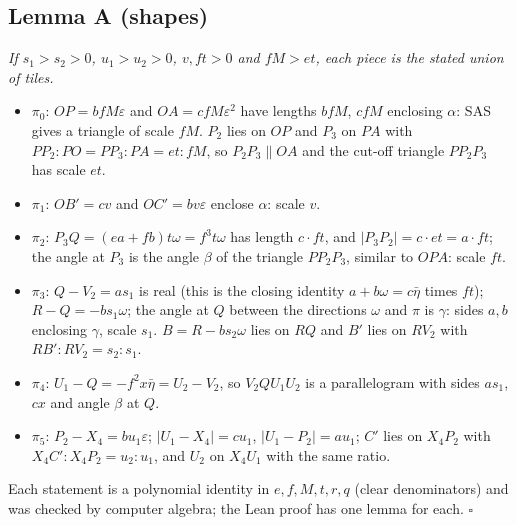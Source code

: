 \documentclass[11pt,reqno]{amsart}
\theoremstyle{plain}
\theoremstyle{definition}
\begin{document}
\subsection{Lemma A (shapes)}
\emph{If $s_1>s_2>0$, $u_1>u_2>0$, $v,ft>0$ and $fM>et$, each piece is the stated union of tiles.}
\begin{itemize}
\item $\pi_0$: $OP=bfM\varepsilon$ and $OA=cfM\varepsilon^2$ have lengths $bfM$, $cfM$ enclosing $\alpha$: SAS gives a triangle of scale $fM$. $P_2$ lies on $OP$ and $P_3$ on $PA$ with $PP_2:PO=PP_3:PA=et:fM$, so $P_2P_3\parallel OA$ and the cut-off triangle $PP_2P_3$ has scale $et$.
\item $\pi_1$: $OB'=cv$ and $OC'=bv\varepsilon$ enclose $\alpha$: scale $v$.
\item $\pi_2$: $P_3Q=(ea+fb)t\omega=f^3t\omega$ has length $c\cdot ft$, and $|P_3P_2|=c\cdot et=a\cdot ft$; the angle at $P_3$ is the angle $\beta$ of the triangle $PP_2P_3$, similar to $OPA$: scale $ft$.
\item $\pi_3$: $Q-V_2=as_1$ is real (this is the closing identity $a+b\omega=c\bar\eta$ times $ft$); $R-Q=-bs_1\omega$; the angle at $Q$ between the directions $\omega$ and $\pi$ is $\gamma$: sides $a,b$ enclosing $\gamma$, scale $s_1$. $B=R-bs_2\omega$ lies on $RQ$ and $B'$ lies on $RV_2$ with $RB':RV_2=s_2:s_1$.
\item $\pi_4$: $U_1-Q=-f^2x\bar\eta=U_2-V_2$, so $V_2QU_1U_2$ is a parallelogram with sides $as_1$, $cx$ and angle $\beta$ at $Q$.
\item $\pi_5$: $P_2-X_4=bu_1\varepsilon$; $|U_1-X_4|=cu_1$, $|U_1-P_2|=au_1$; $C'$ lies on $X_4P_2$ with $X_4C':X_4P_2=u_2:u_1$, and $U_2$ on $X_4U_1$ with the same ratio.
\end{itemize}
Each statement is a polynomial identity in $e,f,M,t,r,q$ (clear denominators) and was checked by computer algebra; the Lean proof has one lemma for each. $\square$
\end{document}
